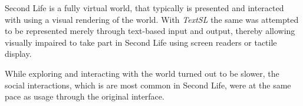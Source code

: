 \begin{example}[TextSL]
  Second Life is a fully virtual world, that typically is presented and interacted with using a visual rendering of the world. With \emph{TextSL} the same was attempted to be represented merely through text-based input and output, thereby allowing visually impaired to take part in Second Life using screen readers or tactile display.

  While exploring and interacting with the world turned out to be slower, the social interactions, which is are most common in Second Life, were at the same pace as usage through the original interface. \cite{oktay}
\end{example}